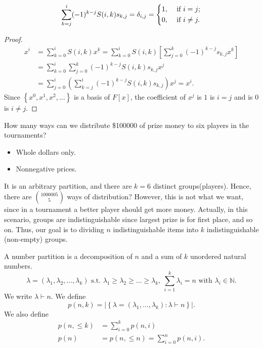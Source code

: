 \begin{corollary}
    \[
        \sum_{k=j}^i (-1)^{k-j} S(i, k) s_{k,j} = \delta _{i,j} = \begin{dcases}
            1, &\text{ if } i=j ;\\
            0, &\text{ if }  i \neq j.
        \end{dcases} 
    \]
\end{corollary}
\begin{proof}
    \begin{align*}
        x^i &= \sum_{k=0}^i S(i, k)x^{\underline{k}} = \sum_{k=0}^i S(i, k) \left[ \sum_{j=0}^k (-1)^{k-j} s_{k, j}x^k  \right] \\
        &= \sum_{k=0}^i \sum_{j=0}^k (-1)^{k-j} S(i, k) s_{k, j}x^j \\
        &= \sum_{j=0}^i \left( \sum_{k=j}^i (-1)^{k-j} S(i, k) s_{k, j} \right) x^j = x^i.    
    \end{align*}
    Since \(\left\{ x^0, x^1, x^2, \dots  \right\} \) is a basis of \(F[x]\), the coefficient of \(x^j\) is \(1\) is \(i=j\) and is \(0\) is \(i \neq j\).      
\end{proof}

\begin{question}
    How many ways can we distribute \$100000 of prize money to six players in the tournaments?
    \begin{itemize}
        \item Whole dollars only. 
        \item Nonnegative prices.
    \end{itemize}
\end{question}
It is an arbitrary partition, and there are \(k=6\) distinct groups(players). Hence, there are \(\binom{1000005}{5}\) ways of distribution? However, this is not what we want, since in a tournament a better player should get more money. Actually, in this scenario, groups are indistinguishable since largest prize is for first place, and so on. Thus, our goal is to dividing \(n\) indistinguishable items into \(k\) indistinguishable (non-empty) groups. 

\begin{definition}
    A number partition is a decomposition of \(n\) and a sum of \(k\) unordered natural numbers.  
    \[
        \lambda = (\lambda _1, \lambda _2, \dots , \lambda _k) \text{ s.t. } \lambda _1 \ge \lambda _2 \ge \dots \ge \lambda _k, \ \sum_{i=1}^k \lambda  _i = n \text{ with } \lambda _i \in \mathbb{N} . 
    \]
    We write \(\lambda \vdash n\). We define 
    \[
        p(n, k) = \left\vert \left\{ \lambda = (\lambda _1, \dots , \lambda _k) : \lambda \vdash n \right\}  \right\vert.
    \] 
    We also define 
    \begin{align*}
        p(n, \le k) &= \sum_{i=0}^k p(n, i) \\
        p(n) &= p(n, \le n) = \sum_{i=0}^n p(n, i) .
    \end{align*}
\end{definition}

